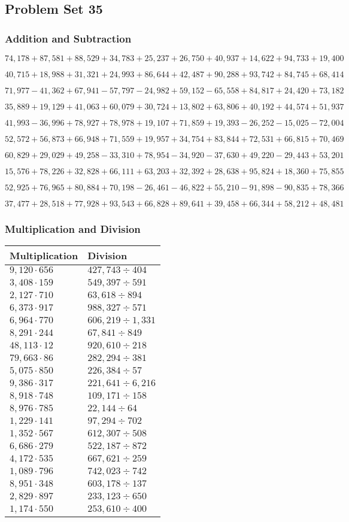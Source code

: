 \hypertarget{problem-set-35-4}{%
\subsection{Problem Set 35}\label{problem-set-35-4}}

\hypertarget{addition-and-subtraction-257}{%
\subsubsection{Addition and
Subtraction}\label{addition-and-subtraction-257}}

\(74,178+87,581+88,529+34,783+25,237+26,750+40,937+14,622+94,733+ 19,400\)

\(40,715+18,988+31,321+24,993+86,644+42,487+90,288+93,742+84,745+68,414\)

\(71,977-41,362+67,941-57,797-24,982+59,152-65,558+84,817+24,420+73,182\)

\(35,889+19,129+41,063+60,079+30,724+13,802+63,806+40,192+44,574+51,937\)

\(41,993-36,996+78,927+78,978+19,107+71,859+19,393-26,252-15,025-72,004\)

\(52,572+56,873+66,948+71,559+19,957+34,754+83,844+72,531+66,815+70,469\)

\(60,829+29,029+49,258-33,310+78,954-34,920-37,630+49,220-29,443+53,201\)

\(15,576+78,226+32,828+66,111+63,203+32,392+28,638+95,824+18,360+75,855\)

\(52,925+76,965+80,884+70,198-26,461-46,822+55,210-91,898-90,835+78,366\)

\(37,477+28,518+77,928+93,543+66,828+89,641+39,458+66,344+58,212+48,481\)

\hypertarget{multiplication-and-division-256}{%
\subsubsection{Multiplication and
Division}\label{multiplication-and-division-256}}

\begin{longtable}[]{@{}ll@{}}
\toprule
Multiplication & Division\tabularnewline
\midrule
\endhead
\(9,120\cdot656\) & \(427,743÷404\)\tabularnewline
\(3,408\cdot159\) & \(549,397÷591\)\tabularnewline
\(2,127\cdot710\) & \(63,618÷894\)\tabularnewline
\(6,373\cdot917\) & \(988,327÷571\)\tabularnewline
\(6,964\cdot770\) & \(606,219÷1,331\)\tabularnewline
\(8,291\cdot244\) & \(67,841÷849\)\tabularnewline
\(48,113\cdot12\) & \(920,610÷218\)\tabularnewline
\(79,663\cdot86\) & \(282,294÷381\)\tabularnewline
\(5,075\cdot850\) & \(226,384÷57\)\tabularnewline
\(9,386\cdot317\) & \(221,641÷6,216\)\tabularnewline
\(8,918\cdot748\) & \(109,171÷158\)\tabularnewline
\(8,976\cdot785\) & \(22,144÷64\)\tabularnewline
\(1,229\cdot141\) & \(97,294÷702\)\tabularnewline
\(1,352\cdot567\) & \(612,307÷508\)\tabularnewline
\(6,686\cdot279\) & \(522,187÷872\)\tabularnewline
\(4,172\cdot535\) & \(667,621÷259\)\tabularnewline
\(1,089\cdot796\) & \(742,023÷742\)\tabularnewline
\(8,951\cdot348\) & \(603,178÷137\)\tabularnewline
\(2,829\cdot897\) & \(233,123÷650\)\tabularnewline
\(1,174\cdot550\) & \(253,610÷400\)\tabularnewline
\bottomrule
\end{longtable}

